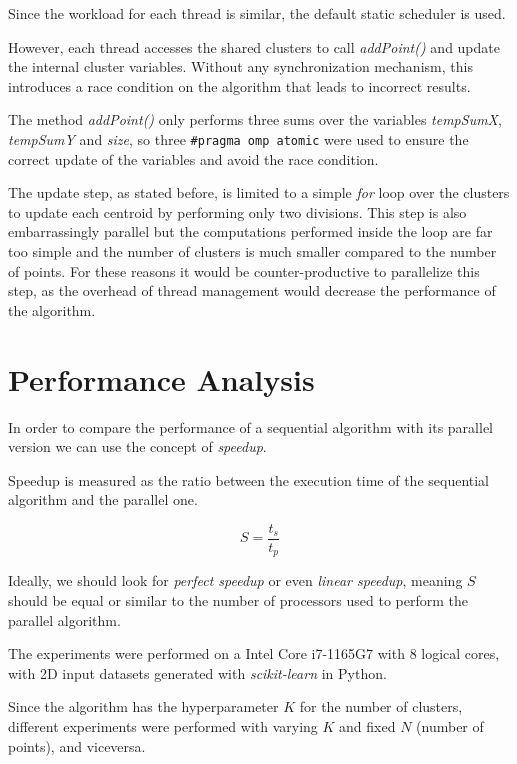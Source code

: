 \documentclass[10pt,twocolumn,letterpaper]{article}
\begin{document}
Since the workload for each thread is similar, the default static scheduler is used.

However, each thread accesses the shared clusters to call \textit{addPoint()} and update the internal cluster variables. Without any synchronization mechanism, this introduces a race condition on the algorithm that leads to incorrect results.

The method \textit{addPoint()} only performs three sums over the variables \textit{tempSumX}, \textit{tempSumY} and \textit{size}, so three \verb"#pragma omp atomic" were used to ensure the correct update of the variables and avoid the race condition.

The update step, as stated before, is limited to a simple \textit{for} loop over the clusters to update each centroid by performing only two divisions. This step is also embarrassingly parallel but the computations performed inside the loop are far too simple and the number of clusters is much smaller compared to the number of points. For these reasons it would be counter-productive to parallelize this step, as the overhead of thread management would decrease the performance of the algorithm.

\section{Performance Analysis}
In order to compare the performance of a sequential algorithm with its parallel version we can use the concept of \textit{speedup}.

Speedup is measured as the ratio between the execution time of the sequential algorithm and the parallel one.

\[S = \frac{t_s}{t_p}\]

Ideally, we should look for \textit{perfect speedup} or even \textit{linear speedup}, meaning $S$ should be equal or similar to the number of processors used to perform the parallel algorithm.

The experiments were performed on a Intel Core i7-1165G7 with 8 logical cores, with 2D input datasets generated with \textit{scikit-learn} in Python.

Since the algorithm has the hyperparameter $K$ for the number of clusters, different experiments were performed with varying $K$ and fixed $N$ (number of points), and viceversa.
\end{document}
